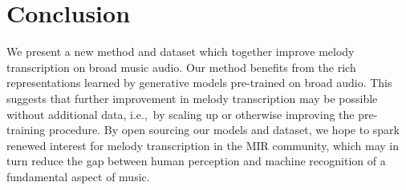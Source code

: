 \vspace{-2mm}
\section{Conclusion}

We present a new method and dataset which together improve melody transcription on broad music audio. 
Our method benefits from the rich representations learned by generative models pre-trained on broad audio. 
This suggests that further improvement in melody transcription may be possible without additional data, i.e.,~by scaling up or otherwise improving the pre-training procedure. 
By open sourcing our models and dataset, 
we hope to spark renewed interest for melody transcription in the MIR community, 
which may in turn reduce the gap between human perception and machine recognition of 
a fundamental aspect of music.

